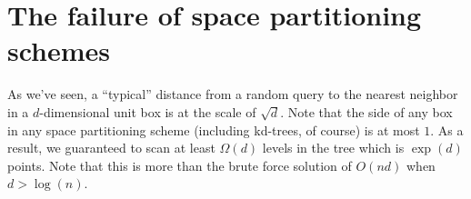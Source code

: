 \documentclass{article}
\begin{document}
\section{The failure of space partitioning schemes}
As we've seen, a ``typical'' distance from a random query to the nearest neighbor in a $d$-dimensional unit box is at the scale of $\sqrt{d}$.
Note that the side of any box in any space partitioning scheme (including kd-trees, of course) is at most $1$. 
As a result, we guaranteed to scan at least $\Omega(d)$ levels in the tree which is $\exp(d)$ points.
Note that this is more than the brute force solution of $O(nd)$ when $d > \log(n)$. 







\end{document}
